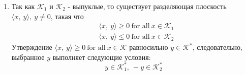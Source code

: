\documentclass{article}
\begin{document}
\begin{enumerate}
    \item
          Так как $\mathcal{K}_1$ и $\mathcal{K}_2$ - выпуклые, то существует разделяющая плоскость $\langle x, \ y \rangle, \ y \neq 0$, такая что
          \begin{align*}
               & \langle x, \ y \rangle \geq 0 \ \text{for all} \  x \in \mathcal{K}_1 \\
               & \langle x, \ y \rangle \leq 0 \ \text{for all} \ x \in \mathcal{K}_2
          \end{align*}
          Утверждение $\langle x, \ y \rangle \geq 0 \ \text{for all} \  x \in \mathcal{K}$ равносильно $y \in \mathcal{K}^{*}$, следовательно, выбранное $y$ выполняет следующие условия:
          \[
              y \in \mathcal{K}_1^*, \ -y \in \mathcal{K}_2^*
          \]

\end{enumerate}
\end{document}
